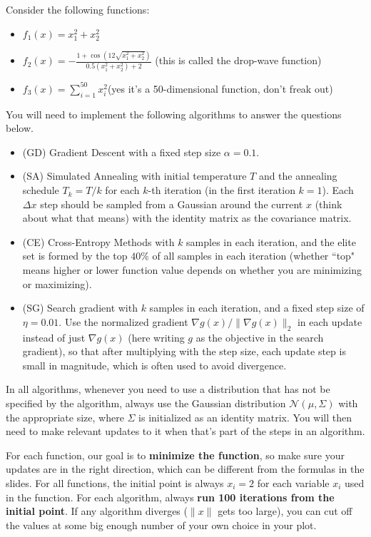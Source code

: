 \documentclass{article}
\begin{document}
\begin{question}
Consider the following functions:
\begin{itemize}
    \item $f_1(x)=x_1^2+x_2^2$
    \item $f_2(x)=-\displaystyle{\frac{1+\cos(12\sqrt{x_1^2+x_2^2})}{0.5(x_1^2+x_2^2)+2}}$ \quad (this is called the drop-wave function)
    \item $f_3(x)=\sum_{i=1}^{50} x_i^2$\quad (yes it's a 50-dimensional function, don't freak out)
\end{itemize}
You will need to implement the following algorithms to answer the questions below. 
\begin{itemize}
    \item (GD) Gradient Descent with a fixed step size $\alpha=0.1$. 
    \item (SA) Simulated Annealing with initial temperature $T$ and the annealing schedule $T_k=T/k$ for each $k$-th iteration (in the first iteration $k=1$). Each $\Delta x$ step should be sampled from a Gaussian around the current $x$ (think about what that means) with the identity matrix as the covariance matrix.
    \item (CE) Cross-Entropy Methods with $k$ samples in each iteration, and the elite set is formed by the top $40\%$ of all samples in each iteration (whether ``top" means higher or lower function value depends on whether you are minimizing or maximizing). 
    \item (SG) Search gradient with $k$ samples in each iteration, and a fixed step size of $\eta=0.01$. Use the normalized gradient $\nabla g(x)/\|\nabla g(x)\|_2$ in each update instead of just $\nabla g(x)$ (here writing $g$ as the objective in the search gradient), so that after multiplying with the step size, each update step is small in magnitude, which is often used to avoid divergence. 
\end{itemize}
In all algorithms, whenever you need to use a distribution that has not be specified by the algorithm, always use the Gaussian distribution $\mathcal{N}(\mu,\Sigma)$ with the appropriate size, where $\Sigma$ is initialized as an identity matrix. You will then need to make relevant updates to it when that's part of the steps in an algorithm. 

For each function, our goal is to {\bf minimize the function}, so make sure your updates are in the right direction, which can be different from the formulas in the slides. For all functions, the initial point is always $x_i=2$ for each variable $x_i$ used in the function. For each algorithm, always {\bf run 100 iterations from the initial point}. If any algorithm diverges ($\|x\|$ gets too large), you can cut off the values at some big enough number of your own choice in your plot. 


\end{question}
\end{document}
